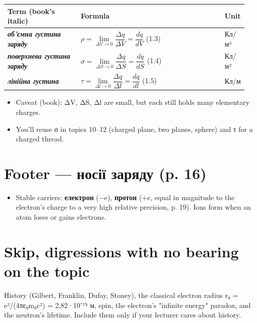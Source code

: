 \documentclass[11pt,a4paper,oneside]{book}
\begin{document}
{\small
\begin{longtable}{>{\raggedright\arraybackslash}p{0.306\linewidth}>{\raggedright\arraybackslash}p{0.594\linewidth}>{\raggedright\arraybackslash}p{0.052\linewidth}}
\toprule
\textbf{Term (book's italic)} & \textbf{Formula} & \textbf{Unit} \\
\midrule
\endhead
\textbf{\textit{об'ємна густина заряду}} & $\rho = \lim\limits_{\Delta V\to0}\dfrac{\Delta q}{\Delta V} = \dfrac{dq}{dV}$ (1.3) & Кл/м³ \\
\textbf{\textit{поверхнева густина заряду}} & $\sigma = \lim\limits_{\Delta S\to0}\dfrac{\Delta q}{\Delta S} = \dfrac{dq}{dS}$ (1.4) & Кл/м² \\
\textbf{\textit{лінійна густина}} & $\tau = \lim\limits_{\Delta l\to0}\dfrac{\Delta q}{\Delta l} = \dfrac{dq}{dl}$ (1.5) & Кл/м \\
\bottomrule
\end{longtable}
}

\begin{itemize}
\item Caveat (book): ΔV, ΔS, Δl are small, but each still holds many elementary charges.
\item You'll reuse σ in topics 10–12 (charged plane, two planes, sphere) and τ for a charged thread.
\end{itemize}

\section*{Footer — носії заряду (p. 16)}

\begin{itemize}
\item Stable carriers: \textbf{електрон} (−e), \textbf{протон} (+e, equal in magnitude to the electron's charge to a very high relative precision, p. 19). Ions form when an atom loses or gains electrons.
\end{itemize}

\par\noindent{\color{accent!30}\rule{\linewidth}{0.4pt}}\par

\section*{Skip, digressions with no bearing on the topic}

History (Gilbert, Franklin, Dufay, Stoney), the classical electron radius r₀ = e²/(4πε₀m₀c²) = 2,82·10⁻¹⁵ м, spin, the electron's "infinite energy" paradox, and the neutron's lifetime. Include them only if your lecturer cares about history.
\end{document}
